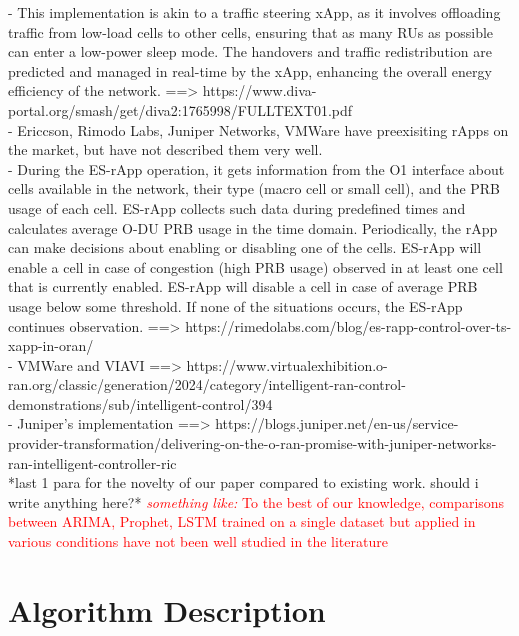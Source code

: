 \documentclass[conference]{IEEEtran}
\begin{document}
- This implementation is akin to a traffic steering xApp, as it involves offloading traffic from low-load cells to other cells, ensuring that as many RUs as possible can enter a low-power sleep mode. The handovers and traffic redistribution are predicted and managed in real-time by the xApp, enhancing the overall energy efficiency of the network. ==> https://www.diva-portal.org/smash/get/diva2:1765998/FULLTEXT01.pdf \\

- Ericcson, Rimodo Labs, Juniper Networks, VMWare have preexisiting rApps on the market, but have not described them very well. \\

- During the ES-rApp operation, it gets information from the O1 interface about cells available in the network, their type (macro cell or small cell), and the PRB usage of each cell. ES-rApp collects such data during predefined times and calculates average O-DU PRB usage in the time domain. Periodically, the rApp can make decisions about enabling or disabling one of the cells. ES-rApp will enable a cell in case of congestion (high PRB usage) observed in at least one cell that is currently enabled. ES-rApp will disable a cell in case of average PRB usage below some threshold. If none of the situations occurs, the ES-rApp continues observation. ==> https://rimedolabs.com/blog/es-rapp-control-over-ts-xapp-in-oran/ \\

- VMWare and VIAVI ==> https://www.virtualexhibition.o-ran.org/classic/generation/2024/category/intelligent-ran-control-demonstrations/sub/intelligent-control/394 \\

- Juniper's implementation ==> https://blogs.juniper.net/en-us/service-provider-transformation/delivering-on-the-o-ran-promise-with-juniper-networks-ran-intelligent-controller-ric \\

*last 1 para for the novelty of our paper compared to existing work. should i write anything here?* \textcolor{red}{\textit{something like: } To the best of our knowledge, comparisons between ARIMA, Prophet, LSTM trained on a single dataset but applied in various conditions have not been well studied in the literature}

\section{Algorithm Description}
\end{document}
